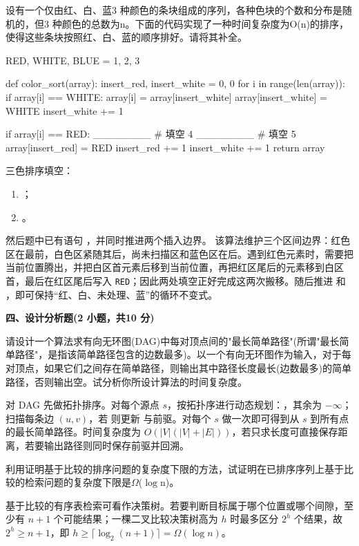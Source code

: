 \begin{question}
设有一个仅由红、白、蓝3 种颜色的条块组成的序列，各种色块的个数和分布是随机的，但3 种颜色的总数为n。下面的代码实现了一种时间复杂度为O(n)的排序，使得这些条块按照红、白、蓝的顺序排好。请将其补全。\\
\begin{pycode}
RED, WHITE, BLUE = 1, 2, 3


def color_sort(array):
    insert_red, insert_white = 0, 0
    for i in range(len(array)):
        if array[i] == WHITE:
            array[i] = array[insert_white]
            array[insert_white] = WHITE
            insert_white += 1

        if array[i] == RED:
            ________                    # 填空 4
            ________                    # 填空 5
            array[insert_red] = RED
            insert_red += 1
            insert_white += 1
    return array
\end{pycode}
\begin{solution}
三色排序填空：
  \begin{enumerate}[leftmargin=2em]
    \item \texttt{}；
    \item \texttt{}。
  \end{enumerate}
  然后题中已有语句 \texttt{}，并同时推进两个插入边界。
该算法维护三个区间边界：红色区在最前，白色区紧随其后，尚未扫描区和蓝色区在后。遇到红色元素时，需要把当前位置腾出，并把白区首元素后移到当前位置，再把红区尾后的元素移到白区首，最后在红区尾后写入 \texttt{RED}；因此两处填空正好完成这两次搬移。随后推进 \texttt{} 和 \texttt{}，即可保持“红、白、未处理、蓝”的循环不变式。
\end{solution}
\end{question}

\textbf{四、设计分析题(2 小题，共10 分)}
\begin{question}[6 分]
请设计一个算法求有向无环图(DAG)中每对顶点间的"最长简单路径"(所谓"最长简单路径"，是指该简单路径包含的边数最多)。以一个有向无环图作为输入，对于每对顶点，如果它们之间存在简单路径，则输出其中路径长度最长(边数最多)的简单路径，否则输出空。试分析你所设计算法的时间复杂度。

\begin{solution}
对 DAG 先做拓扑排序。对每个源点 $s$，按拓扑序进行动态规划：\texttt{}，其余为 $-\infty$；扫描每条边 $(u,v)$，若 \texttt{} 则更新 \texttt{} 与前驱。对每个 $s$ 做一次即可得到从 $s$ 到所有点的最长简单路径。时间复杂度为 $O(|V|(|V|+|E|))$，若只求长度可直接保存距离，若要输出路径则同时保存前驱并回溯。
\end{solution}
\end{question}

\begin{question}[4 分]
利用证明基于比较的排序问题的复杂度下限的方法，试证明在已排序序列上基于比较的检索问题的复杂度下限是$\Omega$($\log$n)。

\begin{solution}
基于比较的有序表检索可看作决策树。若要判断目标属于哪个位置或哪个间隙，至少有 $n+1$ 个可能结果；一棵二叉比较决策树高为 $h$ 时最多区分 $2^h$ 个结果，故 $2^h\ge n+1$，即 $h\ge\lceil\log_2(n+1)\rceil=\Omega(\log n)$。
\end{solution}
\end{question}
